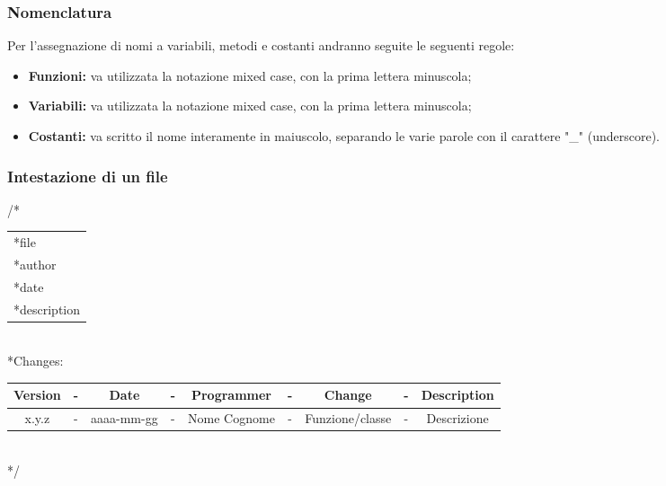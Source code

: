 \subsubsection{Nomenclatura}
Per l'assegnazione di nomi a variabili, metodi e costanti andranno seguite le seguenti regole:
\begin{itemize}
	\item \textbf{Funzioni:} va utilizzata la notazione mixed case, con la prima lettera minuscola;
	\item \textbf{Variabili:} va utilizzata la notazione mixed case, con la prima lettera minuscola;
	\item \textbf{Costanti:} va scritto il nome interamente in maiuscolo, separando le varie parole con il carattere "\_" (underscore).
\end{itemize}

\newpage
\subsubsection{Intestazione di un file}

\begin{flushleft}

/*\\
\vspace{3mm}
\begin{tabular}{l}
	*file\\
	*author\\
	*date\\
	*description\\
\end{tabular}\\
\vspace{5mm}
 *Changes:\\
 \vspace{3mm}
\begin{tabular}{| c c c c c c c c c |}
	\hline
	Version & - & Date & - & Programmer & - & Change & - & Description\\
	\hline
	x.y.z & - & aaaa-mm-gg & - & Nome Cognome & - & Funzione/classe & - & Descrizione\\
	\hline
\end{tabular}\\
\vspace{3mm}
*/\\

\end{flushleft}

